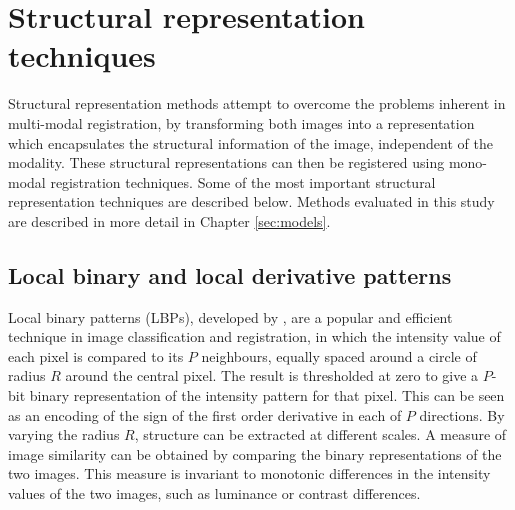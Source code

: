 \documentclass{report}
\begin{document}
\section{Structural representation techniques}
\label{sec:backgroundSR}
Structural representation methods attempt to overcome the problems inherent in multi-modal registration, by transforming both images into a representation which encapsulates the structural information of the image, independent of the modality. These structural representations can then be registered using mono-modal registration techniques. Some of the most important structural representation techniques are described below. Methods evaluated in this study are described in more detail in Chapter \ref{sec:models}.

\subsection{Local binary and local derivative patterns}
Local binary patterns (LBPs), developed by \cite{ojala2002multiresolution}, are a popular and efficient technique in image classification and registration, %
in which the intensity value of each pixel is compared to its $P$ neighbours, equally spaced around a circle of radius $R$ around the central pixel. The result is thresholded at zero to give a $P$-bit binary representation of the intensity pattern for that pixel. This can be seen as an encoding of the sign of the first order derivative in each of $P$ directions. By varying the radius $R$, structure can be extracted at different scales. A measure of image similarity can be obtained by comparing the binary representations of the two images. This measure is invariant to monotonic differences in the intensity values of the two images, such as luminance or contrast differences.
\end{document}
